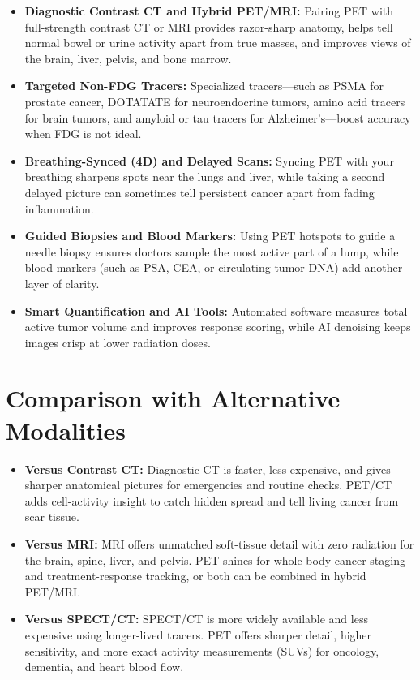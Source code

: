 \begin{itemize}
    \item \textbf{Diagnostic Contrast CT and Hybrid PET/MRI:} Pairing PET with full-strength contrast CT or MRI provides razor-sharp anatomy, helps tell normal bowel or urine activity apart from true masses, and improves views of the brain, liver, pelvis, and bone marrow.
    \item \textbf{Targeted Non-FDG Tracers:} Specialized tracers---such as PSMA for prostate cancer, DOTATATE for neuroendocrine tumors, amino acid tracers for brain tumors, and amyloid or tau tracers for Alzheimer's---boost accuracy when FDG is not ideal.
    \item \textbf{Breathing-Synced (4D) and Delayed Scans:} Syncing PET with your breathing sharpens spots near the lungs and liver, while taking a second delayed picture can sometimes tell persistent cancer apart from fading inflammation.
    \item \textbf{Guided Biopsies and Blood Markers:} Using PET hotspots to guide a needle biopsy ensures doctors sample the most active part of a lump, while blood markers (such as PSA, CEA, or circulating tumor DNA) add another layer of clarity.
    \item \textbf{Smart Quantification and AI Tools:} Automated software measures total active tumor volume and improves response scoring, while AI denoising keeps images crisp at lower radiation doses.
\end{itemize}

\section{Comparison with Alternative Modalities}

\begin{itemize}
    \item \textbf{Versus Contrast CT:} Diagnostic CT is faster, less expensive, and gives sharper anatomical pictures for emergencies and routine checks. PET/CT adds cell-activity insight to catch hidden spread and tell living cancer from scar tissue.
    \item \textbf{Versus MRI:} MRI offers unmatched soft-tissue detail with zero radiation for the brain, spine, liver, and pelvis. PET shines for whole-body cancer staging and treatment-response tracking, or both can be combined in hybrid PET/MRI.
    \item \textbf{Versus SPECT/CT:} SPECT/CT is more widely available and less expensive using longer-lived tracers. PET offers sharper detail, higher sensitivity, and more exact activity measurements (SUVs) for oncology, dementia, and heart blood flow.
\end{itemize}

